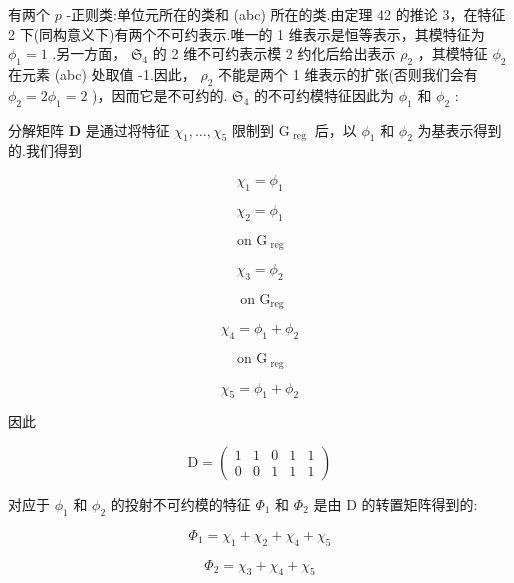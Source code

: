 \documentclass[10pt]{article}
\begin{document}
有两个 \(p\) -正则类:单位元所在的类和 (abc) 所在的类.由定理 42 的推论 3，在特征 2 下(同构意义下)有两个不可约表示.唯一的 1 维表示是恒等表示，其模特征为 \({\phi }_{1} = 1\) .另一方面， \({\mathfrak{S}}_{4}\) 的 2 维不可约表示模 2 约化后给出表示 \({\rho }_{2}\) ，其模特征 \({\phi }_{2}\) 在元素 (abc) 处取值 -1.因此， \({\rho }_{2}\) 不能是两个 1 维表示的扩张(否则我们会有 \({\phi }_{2} = 2{\phi }_{1} = 2\) )，因而它是不可约的. \({\mathfrak{S}}_{4}\) 的不可约模特征因此为 \({\phi }_{1}\) 和 \({\phi }_{2}\) :

\begin{center}
\end{center}

分解矩阵 \(\mathbf{D}\) 是通过将特征 \({\chi }_{1},\ldots ,{\chi }_{5}\) 限制到 \({\mathrm{G}}_{\text{ reg }}\) 后，以 \({\phi }_{1}\) 和 \({\phi }_{2}\) 为基表示得到的.我们得到

\[
{\chi }_{1} = {\phi }_{1}
\]

\[
{\chi }_{2} = {\phi }_{1}
\]

\[
\text{ on }{\mathrm{G}}_{\text{ reg }}
\]

\[
{\chi }_{3} = {\phi }_{2}
\]

\[
\text{ on }{\mathrm{G}}_{\mathrm{{reg}}}
\]

\[
{\chi }_{4} = {\phi }_{1} + {\phi }_{2}
\]

\[
\text{ on }{\mathrm{G}}_{\text{ reg }}
\]

\[
{\chi }_{5} = {\phi }_{1} + {\phi }_{2}
\]

因此

\[
\mathrm{D} = \left( \begin{array}{lllll} 1 & 1 & 0 & 1 & 1 \\  0 & 0 & 1 & 1 & 1 \end{array}\right)
\]

对应于 \({\phi }_{1}\) 和 \({\phi }_{2}\) 的投射不可约模的特征 \({\Phi }_{1}\) 和 \({\Phi }_{2}\) 是由 D 的转置矩阵得到的:

\[
{\Phi }_{1} = {\chi }_{1} + {\chi }_{2} + {\chi }_{4} + {\chi }_{5}
\]

\[
{\Phi }_{2} = {\chi }_{3} + {\chi }_{4} + {\chi }_{5}
\]
\end{document}
